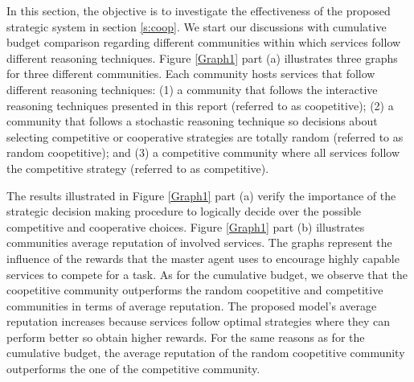 In this section, the objective is to investigate the effectiveness of the proposed strategic system in section \ref{s:coop}.
We start our discussions with cumulative budget comparison
regarding different communities within which services follow
different reasoning techniques. Figure \ref{Graph1} part (a)
illustrates three graphs for three different communities. Each
community hosts services that follow different reasoning
techniques: (1) a community that follows the interactive reasoning
techniques presented in this report (referred to as coopetitive);
(2) a community that follows a stochastic reasoning technique so
decisions about selecting competitive or cooperative strategies
are totally random (referred to as random coopetitive); and (3) a
competitive community where all services follow the competitive
strategy (referred to as competitive).


The results illustrated in Figure \ref{Graph1} part (a)  verify
the importance of the strategic decision making procedure to
logically decide over the possible competitive and cooperative
choices. Figure \ref{Graph1} part (b) illustrates communities
average reputation of involved services. The graphs represent the
influence of the rewards that the master agent uses to encourage
highly capable services to compete for a task. As for the
cumulative budget, we observe that the coopetitive community
outperforms the random coopetitive and competitive communities in
terms of average reputation. The proposed model's average
reputation increases because services follow optimal strategies
where they can perform better so obtain higher rewards. For the
same reasons as for the cumulative budget, the average reputation
of the random coopetitive community
outperforms the one of the competitive community. %


